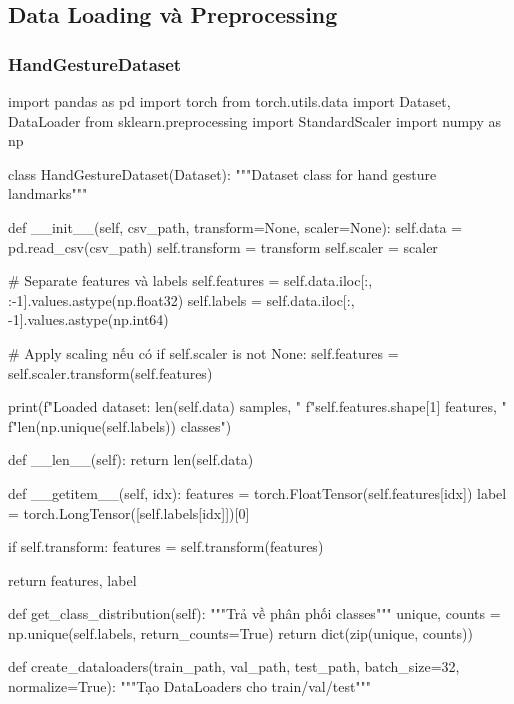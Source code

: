 \subsection{Data Loading và Preprocessing}

\subsubsection{HandGestureDataset}

\begin{aivncodebox}
\begin{python}
import pandas as pd
import torch
from torch.utils.data import Dataset, DataLoader
from sklearn.preprocessing import StandardScaler
import numpy as np

class HandGestureDataset(Dataset):
    """Dataset class for hand gesture landmarks"""
    
    def __init__(self, csv_path, transform=None, scaler=None):
        self.data = pd.read_csv(csv_path)
        self.transform = transform
        self.scaler = scaler
        
        # Separate features và labels
        self.features = self.data.iloc[:, :-1].values.astype(np.float32)
        self.labels = self.data.iloc[:, -1].values.astype(np.int64)
        
        # Apply scaling nếu có
        if self.scaler is not None:
            self.features = self.scaler.transform(self.features)
        
        print(f"Loaded dataset: {len(self.data)} samples, "
              f"{self.features.shape[1]} features, "
              f"{len(np.unique(self.labels))} classes")
    
    def __len__(self):
        return len(self.data)
    
    def __getitem__(self, idx):
        features = torch.FloatTensor(self.features[idx])
        label = torch.LongTensor([self.labels[idx]])[0]
        
        if self.transform:
            features = self.transform(features)
        
        return features, label
    
    def get_class_distribution(self):
        """Trả về phân phối classes"""
        unique, counts = np.unique(self.labels, return_counts=True)
        return dict(zip(unique, counts))

def create_dataloaders(train_path, val_path, test_path, batch_size=32, 
                      normalize=True):
    """Tạo DataLoaders cho train/val/test"""
    

\end{python}
\end{aivncodebox}
